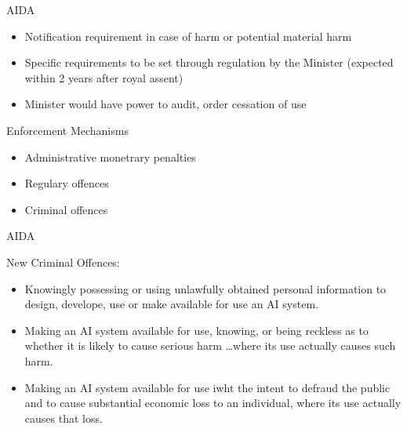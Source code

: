\documentclass[ignorenonframetext,xcolor=x11names]{beamer}
\begin{document}
\begin{frame}{AIDA}
\begin{itemize}
   \item Notification requirement in case of harm or potential material harm
   \item Specific requirements to be set through regulation by the Minister (expected within 2 years after royal assent)
   \item Minister would have power to audit, order cessation of use
\end{itemize}

\begin{block}{Enforcement Mechanisms}
\begin{itemize}
   \item Administrative monetrary penalties
   \item Regulary offences
   \item Criminal offences
\end{itemize}
\end{block}
\end{frame}

\begin{frame}{AIDA}
  \begin{block}{New Criminal Offences:}
   \begin{itemize}
      \item Knowingly possessing or using unlawfully obtained personal information to design, develope, use or make available for use an AI system.
      \item Making an AI system available for use, knowing, or being reckless as to whether it is likely to cause serious harm \ldots where its use actually causes such harm.
      \item Making an AI system available for use iwht the intent to defraud the public and to cause substantial economic loss to an individual, where its use actually causes that loss.
   \end{itemize}
\end{block}
\end{frame}
\end{document}
